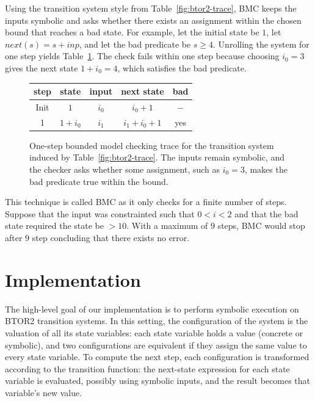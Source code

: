 \documentclass[11pt]{article}
\begin{document}
Using the transition system style from Table~\ref{fig:btor2-trace}, BMC keeps the inputs symbolic and asks whether there exists an assignment within the chosen bound that reaches a bad state. For example, let the initial state be $1$, let $\mathit{next}(s)=s+\mathit{inp}$, and let the bad predicate be $s \geq 4$. Unrolling the system for one step yields Table~\ref{fig:bmc-trace}. The check fails within one step because choosing $i_0 = 3$ gives the next state $1 + i_0 = 4$, which satisfies the bad predicate.

\begin{figure}[H]
    \centering
    \begin{tabular}{|c|c|c|c|c|}
        \hline
        \textbf{step} & \textbf{state} & \textbf{input} & \textbf{next state} & \textbf{bad} \\
        \hline
        Init & $1$ & $i_0$ & $i_0 + 1$ & $-$ \\
        \hline
        1 & $1 + i_0$ & $i_1$ & $i_1 + i_0 + 1$ & yes \\
        \hline
    \end{tabular}
    \caption{One-step bounded model checking trace for the transition system induced by Table~\ref{fig:btor2-trace}. The inputs remain symbolic, and the checker asks whether some assignment, such as $i_0 = 3$, makes the bad predicate true within the bound.}
    \label{fig:bmc-trace}
\end{figure}

This technique is called BMC as it only checks for a finite number of steps. Suppose that the input was constrainted such that $0<i<2$ and that the bad state required the state be $>10$. With a maximum of $9$ steps, BMC would stop after $9$ step concluding that there exists no error.

\section{Implementation}

The high-level goal of our implementation is to perform symbolic execution on BTOR2 transition systems. In this setting, the configuration of the system is the valuation of all its state variables: each state variable holds a value (concrete or symbolic), and two configurations are equivalent if they assign the same value to every state variable. To compute the next step, each configuration is transformed according to the transition function: the next-state expression for each state variable is evaluated, possibly using symbolic inputs, and the result becomes that variable's new value.
\end{document}
